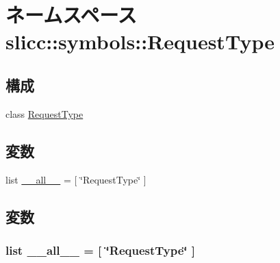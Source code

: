 \hypertarget{namespaceslicc_1_1symbols_1_1RequestType}{
\section{ネームスペース slicc::symbols::RequestType}
\label{namespaceslicc_1_1symbols_1_1RequestType}
}
\subsection*{構成}
\begin{DoxyCompactItemize}
\item 
class \hyperlink{classslicc_1_1symbols_1_1RequestType_1_1RequestType}{RequestType}
\end{DoxyCompactItemize}
\subsection*{変数}
\begin{DoxyCompactItemize}
\item 
list \hyperlink{namespaceslicc_1_1symbols_1_1RequestType_aa4a022e6ddacd362b83964da5cc5d044}{\_\-\_\-all\_\-\_\-} = \mbox{[} \char`\"{}RequestType\char`\"{} \mbox{]}
\end{DoxyCompactItemize}


\subsection{変数}
\hypertarget{namespaceslicc_1_1symbols_1_1RequestType_aa4a022e6ddacd362b83964da5cc5d044}{
\subsubsection[{\_\-\_\-all\_\-\_\-}]{\setlength{\rightskip}{0pt plus 5cm}list {\bf \_\-\_\-all\_\-\_\-} = \mbox{[} \char`\"{}RequestType\char`\"{} \mbox{]}}}
\label{namespaceslicc_1_1symbols_1_1RequestType_aa4a022e6ddacd362b83964da5cc5d044}
